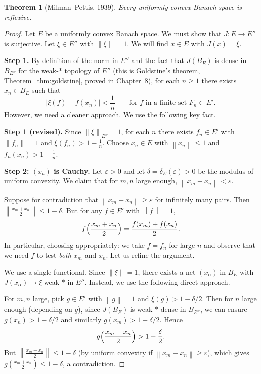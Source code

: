 \documentclass[a4paper,12pt]{book}
\newcommand{\norm}[1]{\left\| #1 \right\|}
\theoremstyle{definition}
\theoremstyle{plain}
\newtheorem{theorem}[definition]{Theorem}
\theoremstyle{remark}
\begin{document}
\begin{theorem}[{Milman--Pettis, 1939}]\label{thm:milman-pettis}
Every uniformly convex Banach space is reflexive.
\end{theorem}

\begin{proof}
Let $E$ be a uniformly convex Banach space.  We must show that
$J:E\to E''$ is surjective.  Let $\xi\in E''$ with $\norm{\xi}=1$.
We will find $x\in E$ with $J(x)=\xi$.

\medskip\noindent\textbf{Step 1.}
By definition of the norm in $E''$ and the fact that $J(B_E)$ is dense in
$B_{E''}$ for the weak-$*$ topology of $E''$ (this is Goldstine's theorem,
Theorem~\ref{thm:goldstine}, proved in Chapter~8), for each $n\ge 1$ there
exists $x_n\in B_E$ such that
\begin{equation}\label{eq:mp-approx}
  |\xi(f) - f(x_n)| < \frac{1}{n} \qquad
  \text{for } f \text{ in a finite set } F_n\subset E'.
\end{equation}
However, we need a cleaner approach.  We use the following key fact.

\medskip\noindent\textbf{Step 1 (revised).}
Since $\norm{\xi}_{E''}=1$, for each $n$ there exists $f_n\in E'$ with
$\norm{f_n}=1$ and $\xi(f_n)>1-\frac{1}{n}$.  Choose $x_n\in E$ with
$\norm{x_n}\le 1$ and $f_n(x_n)>1-\frac{1}{n}$.

\medskip\noindent\textbf{Step 2: $(x_n)$ is Cauchy.}
Let $\varepsilon>0$ and let $\delta = \delta_E(\varepsilon)>0$ be the modulus
of uniform convexity.  We claim that for $m,n$ large enough,
$\norm{x_m-x_n}<\varepsilon$.

Suppose for contradiction that $\norm{x_m-x_n}\ge\varepsilon$ for infinitely
many pairs.  Then $\norm{\frac{x_m+x_n}{2}}\le 1-\delta$.  But for any
$f\in E'$ with $\norm{f}=1$,
\[
  f\Bigl(\frac{x_m+x_n}{2}\Bigr) = \frac{f(x_m)+f(x_n)}{2}.
\]
In particular, choosing appropriately: we take $f = f_n$ for large $n$ and
observe that we need $f$ to test \emph{both} $x_m$ and $x_n$.  Let us
refine the argument.

We use a single functional.  Since $\norm{\xi}=1$, there exists a net
$(x_\alpha)$ in $B_E$ with $J(x_\alpha)\to\xi$ weak-$*$ in $E''$.  Instead,
we use the following direct approach.

For $m,n$ large, pick $g\in E'$ with $\norm{g}=1$ and
$\xi(g)>1-\delta/2$.  Then for $n$ large enough (depending on $g$), since
$J(B_E)$ is weak-$*$ dense in $B_{E''}$, we can ensure $g(x_n)>1-\delta/2$
and similarly $g(x_m)>1-\delta/2$.  Hence
\[
  g\Bigl(\frac{x_m+x_n}{2}\Bigr) > 1-\frac{\delta}{2}.
\]
But $\norm{\frac{x_m+x_n}{2}}\le 1-\delta$ (by uniform convexity if
$\norm{x_m-x_n}\ge\varepsilon$), which gives
$g(\frac{x_m+x_n}{2})\le 1-\delta$, a contradiction.


\end{proof}
\end{document}
